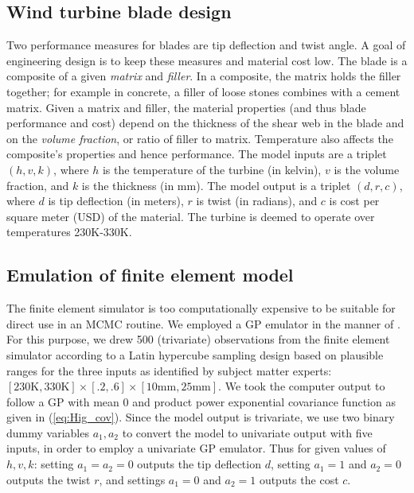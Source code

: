 \documentclass[12pt]{article}
\begin{document}
\subsection{Wind turbine blade design}

Two performance measures for blades are tip deflection and twist angle.
%
A goal of engineering design is to keep these measures and material cost low.
%
The blade is a composite of a given \emph{matrix} and \emph{filler}. 
%
In a composite, the matrix holds the filler together; for example in concrete, a filler of loose stones combines with a cement matrix.
%
Given a matrix and filler, the material properties (and thus blade performance and cost) depend on the thickness of the shear web in the blade and on the \emph{volume fraction}, or ratio of filler to matrix.
%
%
Temperature also affects the composite's properties and hence performance.
%
The model inputs are a triplet $(h,v,k)$, where $h$ is the temperature of the turbine (in kelvin), $v$ is the volume fraction, and $k$ is the thickness (in mm). 
%
The model output is a triplet $(d,r,c)$, where $d$ is tip deflection (in meters), $r$ is twist (in radians), and $c$ is cost per square meter (USD) of the material.
%
The turbine is deemed to operate over temperatures 230K-330K. 
%

\subsection{Emulation of finite element model}\label{emulator} %
The finite element simulator is too computationally expensive to be suitable for direct use in an MCMC routine. 
%
We employed a GP emulator in the manner of \cite{Williams2006}. 
%
For this purpose, we drew 500 (trivariate) observations from the finite element simulator according to a Latin hypercube sampling design \citep{McKay1979} based on plausible ranges for the three inputs as identified by subject matter experts: $[230\mathrm{K}, 330\mathrm{K}] \times [.2,.6]\times[10\mathrm{mm},25\mathrm{mm}]$.
%
We took the computer output to follow a GP with mean 0 and product power exponential covariance function as given in (\ref{eq:Hig_cov}).
%
Since the model output is trivariate, we use two binary dummy variables $a_1,a_2$ to convert the model to univariate output with five inputs, in order to employ a univariate GP emulator.
% 
Thus for given values of $h,v,k$: setting $a_1=a_2=0$ outputs the tip deflection $d$, setting $a_1=1$ and $a_2=0$ outputs the twist $r$, and settings $a_1=0$ and $a_2=1$ outputs the cost $c$.
\end{document}
